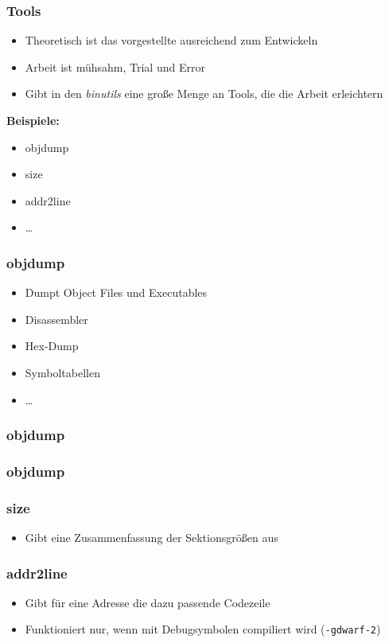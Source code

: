 \documentclass{beamer}
\begin{document}
\begin{frame}
\frametitle{Tools}
\begin{itemize}
\item Theoretisch ist das vorgestellte ausreichend zum Entwickeln
\item Arbeit ist mühsahm, Trial und Error
\item Gibt in den \textit{binutils} eine große Menge an Tools, die die Arbeit erleichtern
\end{itemize}


\textbf{Beispiele:}
\begin{itemize}
\item objdump
\item size
\item addr2line
\item …
\end{itemize}
\end{frame}

\begin{frame}
\frametitle{objdump}
\begin{itemize}
\item Dumpt Object Files und Executables
\item Disassembler
\item Hex-Dump
\item Symboltabellen
\item …
\end{itemize}
\end{frame}

\begin{frame}
\frametitle{objdump}

\end{frame}

\begin{frame}
\frametitle{objdump}

\end{frame}

\begin{frame}
\frametitle{size}
\begin{itemize}
\item Gibt eine Zusammenfassung der Sektionsgrößen aus
\end{itemize}

\end{frame}

\begin{frame}
\frametitle{addr2line}
\begin{itemize}
\item Gibt für eine Adresse die dazu passende Codezeile
\item Funktioniert nur, wenn mit Debugsymbolen compiliert wird (\lstinline{-gdwarf-2})
\end{itemize}

\end{frame}
\end{document}
